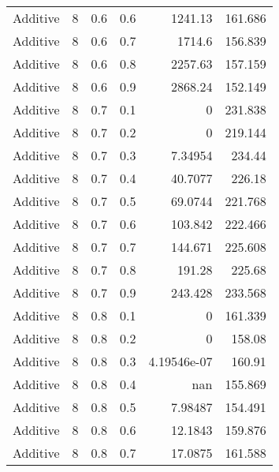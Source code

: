 \documentclass{article}
\begin{document}
\begin{longtable}[H]{lrrrrr}
 Additive       &       8 &   0.6 &            0.6 &   1241.13        &        161.686  \\
 Additive       &       8 &   0.6 &            0.7 &   1714.6         &        156.839  \\
 Additive       &       8 &   0.6 &            0.8 &   2257.63        &        157.159  \\
 Additive       &       8 &   0.6 &            0.9 &   2868.24        &        152.149  \\
 Additive       &       8 &   0.7 &            0.1 &      0           &        231.838  \\
 Additive       &       8 &   0.7 &            0.2 &      0           &        219.144  \\
 Additive       &       8 &   0.7 &            0.3 &      7.34954     &        234.44   \\
 Additive       &       8 &   0.7 &            0.4 &     40.7077      &        226.18   \\
 Additive       &       8 &   0.7 &            0.5 &     69.0744      &        221.768  \\
 Additive       &       8 &   0.7 &            0.6 &    103.842       &        222.466  \\
 Additive       &       8 &   0.7 &            0.7 &    144.671       &        225.608  \\
 Additive       &       8 &   0.7 &            0.8 &    191.28        &        225.68   \\
 Additive       &       8 &   0.7 &            0.9 &    243.428       &        233.568  \\
 Additive       &       8 &   0.8 &            0.1 &      0           &        161.339  \\
 Additive       &       8 &   0.8 &            0.2 &      0           &        158.08   \\
 Additive       &       8 &   0.8 &            0.3 &      4.19546e-07 &        160.91   \\
 Additive       &       8 &   0.8 &            0.4 &    nan           &        155.869  \\
 Additive       &       8 &   0.8 &            0.5 &      7.98487     &        154.491  \\
 Additive       &       8 &   0.8 &            0.6 &     12.1843      &        159.876  \\
 Additive       &       8 &   0.8 &            0.7 &     17.0875      &        161.588  \\

\end{longtable}
\end{document}

